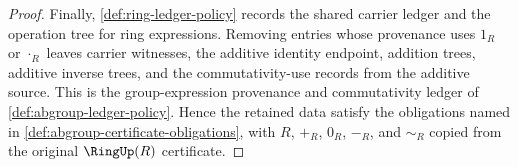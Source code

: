 \begin{proof}
Finally, \autoref{def:ring-ledger-policy} records the shared carrier ledger and the operation tree for ring expressions. Removing entries whose provenance uses $1_R$ or $\cdot_R$ leaves carrier witnesses, the additive identity endpoint, addition trees, additive inverse trees, and the commutativity-use records from the additive source. This is the group-expression provenance and commutativity ledger of \autoref{def:abgroup-ledger-policy}. Hence the retained data satisfy the obligations named in \autoref{def:abgroup-certificate-obligations}, with $R$, $+_R$, $0_R$, $-_R$, and $\sim_R$ copied from the original $\RingUp(R)$ certificate.
\end{proof}
